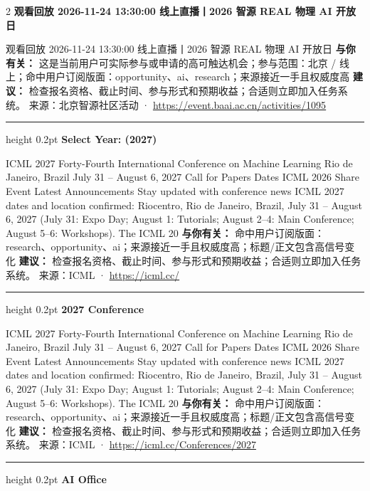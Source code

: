 \documentclass[10.5pt]{ctexart}
\begin{document}
\begin{multicols}{2}
{\large\bfseries 观看回放 2026-11-24 13:30:00 线上直播丨2026 智源 REAL 物理 AI 开放日}\par
观看回放 2026-11-24 13:30:00 线上直播丨2026 智源 REAL 物理 AI 开放日
\textbf{与你有关：} 这是当前用户可实际参与或申请的高可触达机会；参与范围：北京 / 线上；命中用户订阅版面：opportunity、ai、research；来源接近一手且权威度高
\textbf{建议：} 检查报名资格、截止时间、参与形式和预期收益；合适则立即加入任务系统。
{\footnotesize\color{ormuted} 来源：北京智源社区活动 · \url{https://event.baai.ac.cn/activities/1095}}
\vspace{2mm}
\hrule height 0.2pt
\vspace{2mm}
{\large\bfseries Select Year: (2027)}\par
ICML 2027 Forty-Fourth International Conference on Machine Learning Rio de Janeiro, Brazil July 31 – August 6, 2027 Call for Papers Dates ICML 2026 Share Event Latest Announcements Stay updated with conference news ICML 2027 dates and location confirmed: Riocentro, Rio de Janeiro, Brazil, July 31 – August 6, 2027 (July 31: Expo Day; August 1: Tutorials; August 2–4: Main Conference; August 5–6: Workshops). The ICML 20
\textbf{与你有关：} 命中用户订阅版面：research、opportunity、ai；来源接近一手且权威度高；标题/正文包含高信号变化
\textbf{建议：} 检查报名资格、截止时间、参与形式和预期收益；合适则立即加入任务系统。
{\footnotesize\color{ormuted} 来源：ICML · \url{https://icml.cc/}}
\vspace{2mm}
\hrule height 0.2pt
\vspace{2mm}
{\large\bfseries 2027 Conference}\par
ICML 2027 Forty-Fourth International Conference on Machine Learning Rio de Janeiro, Brazil July 31 – August 6, 2027 Call for Papers Dates ICML 2026 Share Event Latest Announcements Stay updated with conference news ICML 2027 dates and location confirmed: Riocentro, Rio de Janeiro, Brazil, July 31 – August 6, 2027 (July 31: Expo Day; August 1: Tutorials; August 2–4: Main Conference; August 5–6: Workshops). The ICML 20
\textbf{与你有关：} 命中用户订阅版面：research、opportunity、ai；来源接近一手且权威度高；标题/正文包含高信号变化
\textbf{建议：} 检查报名资格、截止时间、参与形式和预期收益；合适则立即加入任务系统。
{\footnotesize\color{ormuted} 来源：ICML · \url{https://icml.cc/Conferences/2027}}
\vspace{2mm}
\hrule height 0.2pt
\vspace{2mm}
{\large\bfseries AI Office}\par

\end{multicols}
\end{document}

